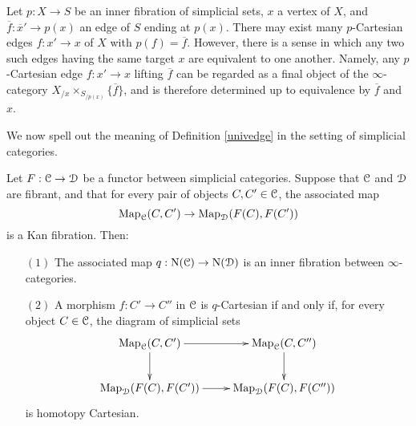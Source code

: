 \begin{remark}\label{kermy}
Let $p: X \rightarrow S$ be an inner fibration of simplicial sets, $x$ a vertex of $X$, and 
$\overline{f}: \overline{x}' \rightarrow p(x)$ an edge of $S$ ending at $p(x)$. There may exist many $p$-Cartesian edges $f: x' \rightarrow x$ of $X$ with $p(f) = \overline{f}$. However, there is a sense in which any two such edges having the same target $x$ are equivalent to one another.
Namely, any $p$-Cartesian edge $f: x' \rightarrow x$ lifting $\overline{f}$ can be regarded as a final object of the $\infty$-category $X_{/x} \times_{ S_{/p(x)} } \{ \overline{f} \}$, and is therefore determined up to equivalence by $\overline{f}$ and $x$.
\end{remark}

We now spell out the meaning of Definition \ref{univedge} in the setting of simplicial categories.

\begin{proposition}\label{trainedg}
Let $F: \operatorname{\mathcal{C}} \rightarrow \operatorname{\mathcal{D}}$ be a functor between simplicial categories.
Suppose that $\operatorname{\mathcal{C}}$ and $\operatorname{\mathcal{D}}$ are fibrant, and that for every pair of objects
$C,C' \in \operatorname{\mathcal{C}}$, the associated map
$$ \operatorname{{Map}}_{\operatorname{\mathcal{C}}}(C,C') \rightarrow \operatorname{{Map}}_{\operatorname{\mathcal{D}}}(F(C),F(C'))$$ is a Kan fibration.
Then:
\begin{itemize}
\item[$(1)$] The associated map $q: \operatorname{N}(\operatorname{\mathcal{C}}) \rightarrow \operatorname{N}(\operatorname{\mathcal{D}})$ is an inner fibration between $\infty$-categories.

\item[$(2)$] A morphism $f: C' \rightarrow C''$ in $\operatorname{\mathcal{C}}$ is $q$-Cartesian if and only if,
for every object $C \in \operatorname{\mathcal{C}}$, the diagram of simplicial sets
$$ \xymatrix{ \bHom_{\calC}(C, C') \ar[r] \ar[d] & \bHom_{\calC}(C,C'') \ar[d] \\
\bHom_{\calD}(F(C), F(C')) \ar[r] & \bHom_{\calD}(F(C), F(C''))}$$
is homotopy Cartesian.
\end{itemize}

\end{proposition}

